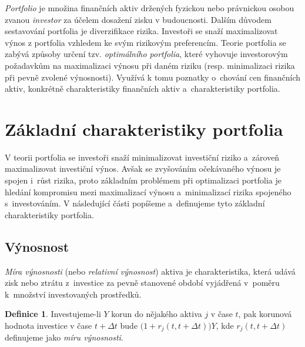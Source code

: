 \documentclass[a4paper,12pt]{report}
\theoremstyle{definition} \newtheorem{definice}[veta]{Definice}
\theoremstyle{remark}
\begin{document}
\textit{Portfolio} je množina finančních aktiv držených fyzickou nebo právnickou osobou zvanou \textit{investor} za účelem dosažení zisku v budoucnosti.
Dalším důvodem sestavování portfolia je diverzifikace rizika.
Investoři se snaží maximalizovat výnos z portfolia vzhledem ke svým rizikovým preferencím.
Teorie portfolia se zabývá způsoby určení tzv. \textit{optimálního portfolia}, které vyhovuje investorovým požadavkům na maximalizaci výnosu při daném riziku (resp. minimalizaci rizika při pevně zvolené výnosnosti).
Využívá k tomu poznatky o~chování cen finančních aktiv, konkrétně charakteristiky finančních aktiv a~charakteristiky portfolia.






\section{Základní charakteristiky portfolia}\label{charakteristiky_portfolia}
V teorii portfolia se investoři snaží minimalizovat investiční riziko a~zároveň maximalizovat investiční výnos. 
Avšak se zvyšováním očekávaného výnosu je spojen i~růst rizika, proto základním problémem při optimalizaci portfolia je hledání kompromisu mezi maximalizací výnosu a~minimalizací rizika spojeného s~investováním.  
V následující části popíšeme a~definujeme tyto základní charakteristiky portfolia.

\subsection{Výnosnost}
\textit{Míra výnosnosti} (nebo \textit{relativní výnosnost}) aktiva je charakteristika, která udává zisk nebo ztrátu z~investice za pevně stanovené období vyjádřená v~poměru k~množství investovaných prostředků.

\begin{definice}
Investujeme-li $Y$ korun do nějakého aktiva $j$ v čase $t$, pak korunová hodnota investice v čase $t+\Delta t$ bude $\big(1+r_j(t,t+\Delta t)\big)Y$, kde  $r_j(t,t+\Delta t)$ definujeme jako \textit{míru výnosnosti}.  
\end{definice}
 
\end{document}
